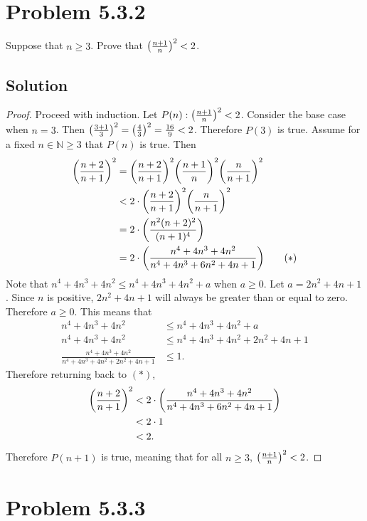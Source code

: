 \documentclass[12pt]{extarticle}
\begin{document}
\section*{Problem 5.3.2}

Suppose that $n \geq 3$. Prove that $\qty(\frac{n+1}{n})^2 < 2$.

\subsection*{Solution}

\begin{proof}
	Proceed with induction. Let $P(n): \qty(\frac{n+1}{n})^2 < 2$. Consider the base case when $n=3$. Then $\qty(\frac{3+1}{3})^2 = \qty(\frac{4}{3})^2 = \frac{16}{9} < 2$. Therefore $P(3)$ is true. Assume for a fixed $n \in \mathbb{N} \geq 3$ that $P(n)$ is true. Then
	\begin{align*}
		\qty(\frac{n+2}{n+1})^2 &= \qty(\frac{n+2}{n+1})^2 \qty(\frac{n+1}{n})^2 \qty(\frac{n}{n+1})^2 \\
														&< 2 \cdot \qty(\frac{n+2}{n+1})^2 \qty(\frac{n}{n+1})^2 \\
														&= 2 \cdot \qty(\frac{n^2 (n+2)^2}{(n+1)^4}) \\
														&= 2 \cdot \qty(\frac{n^4 + 4n^3 + 4n^2}{n^4 + 4n^3 + 6n^2 + 4n + 1}) \tag{$*$}
\end{align*}
	Note that $n^4 + 4n^3 + 4n^2 \leq n^4 + 4n^3 + 4n^2 + a$ when $a \geq 0$. Let $a = 2n^2 + 4n + 1$. Since $n$ is positive, $2n^2 + 4n + 1$ will always be greater than or equal to zero. Therefore $a \geq 0$. This means that 
	\begin{align*}
		n^4 + 4n^3 + 4n^2 &\leq n^4 + 4n^3 + 4n^2 + a \\
		n^4 + 4n^3 + 4n^2 &\leq n^4 + 4n^3 + 4n^2 + 2n^2 + 4n + 1 \\
		\frac{n^4 + 4n^3 + 4n^2}{n^4 + 4n^3 + 4n^2 + 2n^2 + 4n + 1} &\leq 1
	.\end{align*}
	Therefore returning back to $(*)$,
	\begin{align*}
		\qty(\frac{n+2}{n+1})^2 &< 2 \cdot \qty(\frac{n^4 + 4n^3 + 4n^2}{n^4 + 4n^3 + 6n^2 + 4n + 1}) \\
														&< 2 \cdot 1 \\
														&< 2
	.\end{align*}
	Therefore $P(n+1)$ is true, meaning that for all $n \geq 3$, $\qty(\frac{n+1}{n})^2 < 2$. 
\end{proof}

\section*{Problem 5.3.3}
\end{document}
